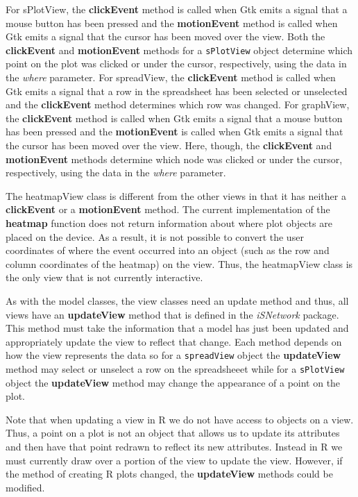 \documentclass{article}[11pt]
\newcommand{\Rfunction}[1]{{\textbf{#1}}}
\newcommand{\Robject}[1]{{\texttt{#1}}}
\newcommand{\Rpackage}[1]{{\textit{#1}}}
\newcommand{\Rslot}[1]{\textsl{#1}}
\newcommand{\Rclass}[1]{\textsf{#1}}
\begin{document}
For \Rclass{sPlotView}, the \Rfunction{clickEvent} method is called when Gtk
emits a signal that a mouse button has been pressed and the
\Rfunction{motionEvent} method is called when Gtk emits a signal that
the cursor has been moved over the view.  Both the \Rfunction{clickEvent} and
\Rfunction{motionEvent} methods for a \Robject{sPlotView} object
determine which point on the plot was clicked or under the cursor,
respectively, using the data in the \Rslot{where} parameter.  For
\Rclass{spreadView}, the \Rfunction{clickEvent} method is called when Gtk
emits a signal that a row in the spreadsheet has been selected or unselected
and the \Rfunction{clickEvent} method determines which row was changed.
For \Rclass{graphView}, the \Rfunction{clickEvent} method is called when Gtk
emits a signal that a mouse button has been pressed and the
\Rfunction{motionEvent} is called when Gtk emits a signal that the cursor has
been moved over the view.  Here, though, the \Rfunction{clickEvent} and
\Rfunction{motionEvent} methods determine which node was clicked or under
the cursor, respectively, using the data in the \Rslot{where} parameter.  

The \Rclass{heatmapView} class is different from the other views in that it
has neither a \Rfunction{clickEvent} or a \Rfunction{motionEvent} method.  The
current implementation of the \Rfunction{heatmap} function does not return
information about where plot objects are placed on the device.  As a result,
it is not possible to convert the user coordinates of where the event occurred
into an object (such as the row and column coordinates of the heatmap) on
the view.  Thus, the \Rclass{heatmapView} class is the only view that is not
currently interactive.  

As with the model classes, the view classes need an update
method and thus, all views have an \Rfunction{updateView} method that is
defined in the \Rpackage{iSNetwork} package.  This method must take the
information that a model has just been updated and appropriately update the
view to reflect that change.  Each method depends on how the view
represents the data so for a \Robject{spreadView} object the
\Rfunction{updateView} method may select or unselect a row on the spreadsheeet
while for a \Robject{sPlotView} object the \Rfunction{updateView} method may
change the appearance of a point on the plot.  

Note that when updating a view in R we do not have access to objects on a
view.  Thus, a point on a plot is not an object that allows us to update its
attributes and then have that point redrawn to reflect its new attributes.
Instead in R we must currently draw over a portion of the view to update the
view.  However, if the method of creating R plots changed, the
\Rfunction{updateView} methods could be modified. 
\end{document}
